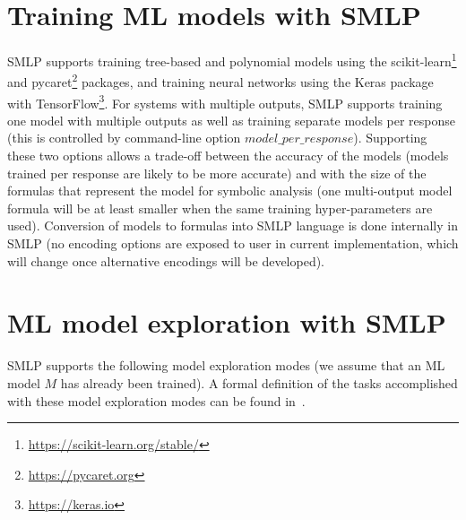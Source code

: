 \documentclass[a4paper,parskip=half]{article} %
\begin{document}
\section{Training ML models with SMLP}\label{sec:models}

SMLP supports training tree-based and polynomial models using the scikit-learn\footnote{\url{https://scikit-learn.org/stable/}} and pycaret\footnote{\url{https://pycaret.org}} packages, 
and training neural networks using the Keras package with TensorFlow\footnote{\url{https://keras.io}}. For systems with multiple outputs, SMLP supports training one model with multiple outputs as well as training separate models per response (this is controlled by command-line option $model\_per\_response$). Supporting these two options allows a trade-off between the accuracy of the models (models trained per response are likely to be more accurate) and with the size of the formulas that represent the model for symbolic analysis (one multi-output model formula will be at least smaller when the same training hyper-parameters are used). Conversion of models to formulas into SMLP language is done internally in SMLP (no encoding options are exposed to user in current implementation, which will change once alternative encodings will be developed).



\section{ML model exploration with SMLP}\label{sec:exploration}

SMLP supports the following model exploration modes (we assume that an ML model $M$ has already been trained). A formal definition of the tasks accomplished with these model exploration modes can be found in~\cite{BKK24}.
\end{document}
